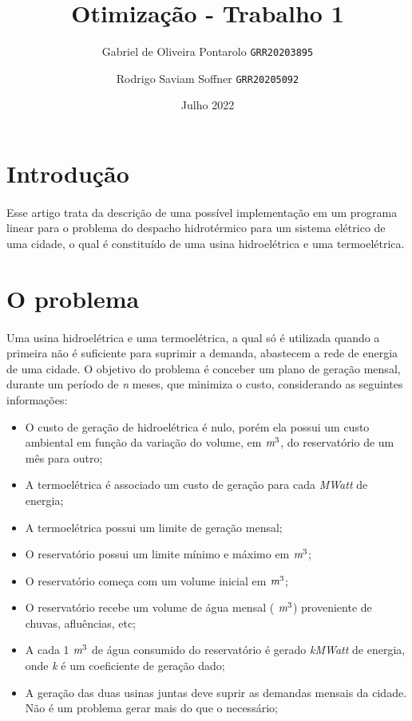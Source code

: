 \documentclass{article}
\title{Otimização - Trabalho 1}
\author{
    Gabriel de Oliveira Pontarolo 
    \texttt{GRR20203895}
    \and 
    Rodrigo Saviam Soffner
    \texttt{GRR20205092}
}
\date{Julho 2022}
\begin{document}
\maketitle

\section{Introdução}
\paragraph{} Esse artigo trata da descrição de uma possível implementação em um programa linear para o problema do despacho hidrotérmico para um sistema elétrico de uma cidade, o qual é constituído de uma usina hidroelétrica e uma termoelétrica.

\section{O problema}
\paragraph{} Uma usina hidroelétrica e uma termoelétrica, a qual só é utilizada quando a primeira não é suficiente para suprimir a demanda, abastecem a rede de energia de uma cidade. O objetivo do problema é conceber um plano de geração mensal, durante um período de \emph{n} meses, que minimiza o custo, considerando as seguintes informações:

\begin{itemize}
    \item O custo de geração de hidroelétrica é nulo, porém ela possui um custo ambiental em função da variação do volume, em $\emph{m}^3$, do reservatório de um mês para outro;
    \item A termoelétrica é associado um custo de geração para cada \emph{MWatt} de energia;
    \item A termoelétrica possui um limite de geração mensal;
    \item O reservatório possui um limite mínimo e máximo em $\emph{m}^3$;
    \item O reservatório começa com um volume inicial em $\emph{m}^3$;
    \item O reservatório recebe um volume de água mensal ( $\emph{m}^3$) proveniente de chuvas, afluências, etc;
    \item A cada 1 $\emph{m}^3$ de água consumido do reservatório é gerado \emph{kMWatt} de energia, onde \emph{k} é um coeficiente de geração dado;
    \item A geração das duas usinas juntas deve suprir as demandas mensais da cidade. Não é um problema gerar mais do que o necessário;
\end{itemize}
\end{document}
